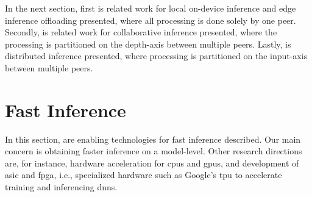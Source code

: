 In the next section, first is related work for local on-device inference and edge inference offloading presented, where all processing is done solely by one peer. Secondly, is related work for collaborative inference presented, where the processing is partitioned on the depth-axis between multiple peers. Lastly, is distributed inference presented, where processing is partitioned on the input-axis between multiple peers. 
\section{Fast Inference} \label{sec:ei-fast-inference}
In this section, are enabling technologies for fast inference described. Our main concern is obtaining faster inference on a model-level. Other research directions are, for instance, hardware acceleration for \gls{cpu}s and \gls{gpu}s, and development of \gls{asic} and \gls{fpga}, i.e., specialized hardware such as Google's \gls{tpu} to accelerate training and inferencing \gls{dnn}s. 

